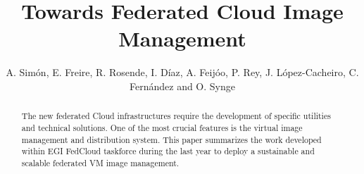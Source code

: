 \documentclass[oribibl]{llncs_Ibergrid2013}
\begin{document}
%
\frontmatter          %
%
\pagestyle{headings}  %
%
\mainmatter              %
%
\title{Towards Federated Cloud Image Management}
%
%
\author{A. Sim\'on, E. Freire, R. Rosende, I. D\'iaz, A. Feij\'oo, P. Rey, J. L\'opez-Cacheiro, C. Fern\'andez and O. Synge}
%
%
%




\maketitle              %

\begin{abstract}
The new federated Cloud infrastructures require the development of specific utilities and technical solutions. One of the most crucial features is the virtual image management and distribution system.
This paper summarizes the work developed within EGI FedCloud taskforce during the last year to deploy a sustainable and scalable federated VM image management.
\end{abstract}

%
\end{document}
